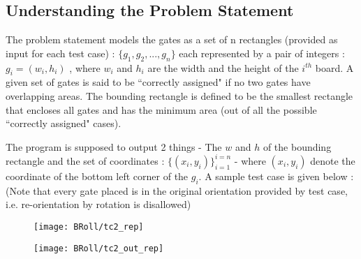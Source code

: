 \documentclass[12pt, a4paper,openany]{article}
\begin{document}
\subsection{Understanding the Problem Statement}
\begin{flushleft}
The problem statement models the gates as a set of n rectangles (provided as input for each test case) : \( \{g_{1},g_{2},...,g_{n}\}\) each represented by a pair of integers : \(g_{i} = (w_{i},h_{i})\) , where \(w_{i}\) and \(h_{i}\) are the width and the height of the \(i^{th}\) board. A given set of gates is said to be “correctly assigned" if no two gates have overlapping areas. The bounding rectangle is defined to be the smallest rectangle that encloses all gates and has the minimum area (out of all the possible “correctly assigned" cases).
\end{flushleft}

\begin{flushleft}
The program is supposed to output 2 things - The \(w\) and \(h\) of the bounding rectangle and the set of coordinates : \(\{ (x_{i},y_{i})\}^{i=n}_{i=1}\) - where \((x_{i},y_{i})\) denote the coordinate of the bottom left corner of the \(g_{i}\). A sample test case is given below :
(Note that every gate placed is in the original orientation provided by test case, i.e. re-orientation by rotation is disallowed)
\end{flushleft}

\begin{figure}[ht]
\centering
  \texttt{[image: BRoll/tc2\_rep]}
   \label{fig:TC2}
\end{figure}


\begin{figure}[ht]
  \centering
  \texttt{[image: BRoll/tc2\_out\_rep]}
  \label{fig:TC2_OUT}
\end{figure}
\end{document}
